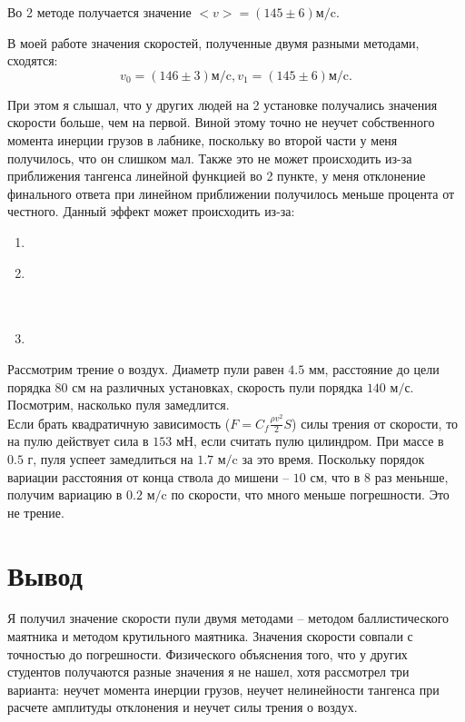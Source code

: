 Во 2 методе получается значение
$<v> = (145 \pm 6)\text{м/c}$.


В моей работе значения скоростей, полученные двумя разными методами, сходятся:
\begin{equation}
v_0 = (146 \pm 3)\text{м/c}, v_1 = (145 \pm 6)\text{м/c}.
\end{equation}

При этом я слышал, что у других людей на 2 установке получались значения скорости больше, чем на первой. Виной этому точно не неучет собственного момента инерции грузов в лабнике, поскольку во второй части у меня получилось, что он слишком мал. Также это не может происходить из-за приближения тангенса линейной функцией во 2 пункте, у меня отклонение финального ответа при линейном приближении получилось меньше процента от честного. Данный эффект может происходить из-за:
\begin{enumerate}
\item {}
\item {}\\\\\\
\item {}
\end{enumerate}
Рассмотрим трение о воздух. Диаметр пули равен $4.5\text{ мм}$, расстояние до цели порядка $80\text{ см}$ на различных установках, скорость пули порядка $140\text{ м$/$с}$. Посмотрим, насколько пуля замедлится.\\
Если брать квадратичную зависимость ($F=C_f\displaystyle \frac{\rho v^2}{2}S$) силы трения от скорости, то на пулю действует сила в $153\text{ мН}$, если считать пулю цилиндром. При массе в $0.5\text{ г}$, пуля успеет замедлиться на $1.7\text{ м/c}$ за это время. Поскольку порядок вариации расстояния от конца ствола до мишени -- $10\text{ см}$, что в 8 раз меньнше, получим вариацию в $0.2\text{ м/c}$ по скорости, что много меньше погрешности. Это не трение.
\section{Вывод}
Я получил значение скорости пули двумя методами -- методом баллистического маятника и методом крутильного маятника. Значения скорости совпали с точностью до погрешности. Физического объяснения того, что у других студентов получаются разные значения я не нашел, хотя рассмотрел три варианта: неучет момента инерции грузов, неучет нелинейности тангенса при расчете амплитуды отклонения и неучет силы трения о воздух.










